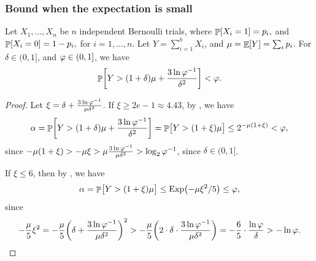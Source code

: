 
\subsubsection{Bound when the expectation is small}


\begin{lemma}
        Let $X_1, \ldots, X_n$ be $n$ independent Bernoulli trials, where
        \begin{math}
            \Prob{  X_i = 1 } =p_i,
        \end{math}
        and
        \begin{math}
            \Prob{  X_i = 0 } =1- p_i,
        \end{math}
        for $i=1,\ldots, n$.  Let $Y = \sum_{i=1}^{b} X_i$, and
        $\mu = \mathop{\mathbb{E}}\!\left[ { Y} \right] = \sum_i p_i$.  For $\delta \in (0,1]$, and
        $\varphi \in (0,1]$, we have
        \begin{equation*}
            \Prob{ \bigl. Y > (1+\delta)\mu + \frac{3\ln
                  \BadProb^{-1}}{\delta^2} }
            < \BadProb.
        \end{equation*}
\end{lemma}

\begin{proof}
    Let $\xi = \delta + \frac{3 \ln \varphi^{-1}}{\mu \delta^2}$.  If
    $\xi \geq 2e -1 \approx 4.43$, by , we
    have
    \begin{equation*}
        \alpha %
        =%
        \Prob{ \bigl. Y > (1+\delta)\mu + \frac{3\ln
              \BadProb^{-1}}{\delta^2} }%
        =%
        \Prob{ \bigl. Y > (1+\xi)\mu  }
        \leq%
        2^{-\mu ( 1+\xi)}
        <%
        \BadProb,       
    \end{equation*}
    since
    $-\mu(1+\xi) > -\mu \xi > \mu \frac{3 \ln \varphi^{-1}}{\mu
       \delta^2} > \log_2 \varphi^{-1}$, since $\delta \in (0,1]$.

    If $\xi \leq 6$, then by , we have
    \begin{equation*}
        \alpha%
        =%
        \Prob{ \bigl. Y > (1+\xi)\mu  }%
        \leq%
        \Exp\pth{ - \mu \xi^2  / 5 }
        \leq %
        \BadProb,
    \end{equation*}
    since
    \begin{equation*}
        - \frac{\mu}{5} \xi^2%
        =%
        - \frac{\mu}{5} \pth{  \delta + \frac{3 \ln \BadProb^{-1}}{\mu
              \delta^2} }^2%
        >%
        - \frac{\mu}{5} \pth{ 2 \cdot  \delta \cdot \frac{3 \ln \BadProb^{-1}}{\mu
              \delta^2} }%
        =%
        -\frac{6}{5} \cdot \frac{\ln \BadProb}{\delta} >
        -\ln \BadProb.        
    \end{equation*}
\end{proof}

